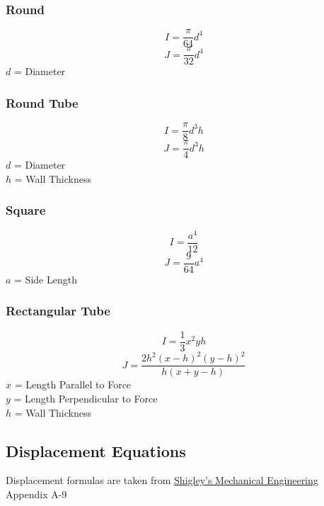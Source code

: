 \documentclass[11pt,a4paper,titlepage]{article}
\begin{document}
	\subsubsection{Round}
	\begin{equation}
		I = \frac{\pi}{64} d^4
	\end{equation}
	\begin{equation}
		J = \frac{\pi}{32} d^4
	\end{equation}
	$d$ = Diameter
	
	\subsubsection{Round Tube}
	\begin{equation}
		I = \frac{\pi}{8} d^3 h
	\end{equation}
	\begin{equation}
		J = \frac{\pi}{4} d^3 h
	\end{equation}
	$d$ = Diameter \\
	$h$ = Wall Thickness
	
	\subsubsection{Square}
	\begin{equation}
		I = \frac{a^4}{12}
	\end{equation}
	\begin{equation}
		J = \frac{9}{64} a^4
	\end{equation}
	$a$ = Side Length
	
	\subsubsection{Rectangular Tube}
	\begin{equation}
		I = \frac{1}{3} x^2 y h
	\end{equation}
	\begin{equation}
		J = \frac{2 h^2 (x-h)^2 (y-h)^2}{h (x + y - h)}
	\end{equation}
	$x$ = Length Parallel to Force \\
	$y$ = Length Perpendicular to Force \\
	$h$ = Wall Thickness
	
	\subsection{Displacement Equations}
	Displacement formulas are taken from \href{https://fac.ksu.edu.sa/sites/default/files/mechanical-disgin-shigley.pdf}{Shigley's Mechanical Engineering} Appendix A-9
\end{document}
